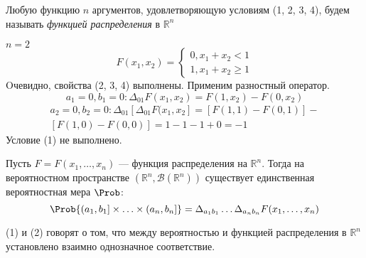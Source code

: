 \begin{definition}
	Любую функцию $n$ аргументов, удовлетворяющую условиям (1, 2, 3, 4), будем называть \textit{функцией распределения} в $\mathbb{R}^n$
\end{definition}
\begin{example}
	$n = 2$ \\
	\[
		F(x_1, x_2) =
		\begin{cases}
			0, x_1 + x_2 < 1 \\
			1, x_1 + x_2 \geqslant 1
		\end{cases}
	\]
	Oчевидно, свойства (2, 3, 4) выполнены. Применим разностный оператор.
	\[
		a_1 = 0, b_1 = 0 : \Delta_{0 1} F(x_1, x_2) = F(1,x_2) - F(0, x_2)
	\]
	\[
		\begin{split}
			a_2 = 0, b_2 = 0 : \Delta_{0 1} [\Delta_{0 1} F(x_1, x_2] = [F(1,1) - F(0, 1)] - \\
			[F(1,0) - F(0,0)] = 1 - 1 - 1 + 0 = -1
		\end{split}
	\]
	Условие (1) не выполнено.
\end{example}
\begin{theorem}
	Пусть $F = F(x_1, \ldots, x_n)$ --- функция распределения на $\mathbb{R}^n$. Тогда на вероятностном пространстве $(\mathbb{R}^n, \mathcal{B}(\mathbb{R}^n))$ существует единственная вероятностная мера $\Prob$:
	\begin{equation}
		\Prob \{ (a_1, b_1] \times \ldots \times (a_n, b_n] \} = \Delta_{a_1 b_1} \dots \Delta_{a_n b_n} F(x_1, \ldots, x_n)
	\end{equation}
\end{theorem}
(1) и (2) говорят о том, что между вероятностью и функцией распределения в $\mathbb{R}^n$ установлено взаимно однозначное соответствие.


